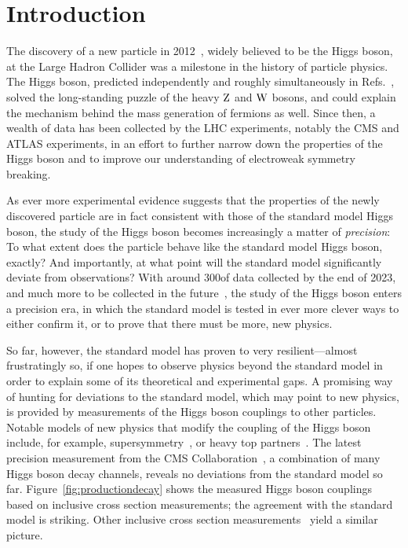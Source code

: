 \section{Introduction}
\label{sec:introduction}


The discovery of a new particle in 2012~\cite{Aad:2012tfa,Chatrchyan:2012xdj,Chatrchyan:2013lba}, widely believed to be the Higgs boson, at the Large Hadron Collider was a milestone in the history of particle physics.
% 
The Higgs boson, predicted independently and roughly simultaneously in Refs.~\cite{Higgs:1964pj,Englert:1964et,Guralnik:1964eu}, solved the long-standing puzzle of the heavy $\mathrm{Z}$ and $\mathrm{W}$ bosons, and could explain the mechanism behind the mass generation of fermions as well.
% 
Since then, a wealth of data has been collected by the LHC experiments, notably the CMS and ATLAS experiments, in an effort to further narrow down the properties of the Higgs boson and to improve our understanding of electroweak symmetry breaking.


As ever more experimental evidence suggests that the properties of the newly discovered particle are in fact consistent with those of the standard model Higgs boson,
% 
% 
the study of the Higgs boson becomes increasingly a matter of \textit{precision}: To what extent does the particle behave like the standard model Higgs boson, exactly?
% 
And importantly, at what point will the standard model significantly deviate from observations?
% 
With around 300\fbinv of data collected by the end of 2023, and much more to be collected in the future~\cite{hllhc}, the study of the Higgs boson enters a precision era, in which the standard model is tested in ever more clever ways to either confirm it, or to prove that there must be more, new physics.


So far, however, the standard model has proven to very resilient---almost frustratingly so, if one hopes to observe physics beyond the standard model in order to explain some of its theoretical and experimental gaps.
% 
A promising way of hunting for deviations to the standard model, which may point to new physics, is provided by measurements of the Higgs boson couplings to other particles.
% 
Notable models of new physics that modify the coupling of the Higgs boson include, for example, supersymmetry~\cite{Dimopoulos:1981zb,Witten:1981nf}, or heavy top partners~\cite{ArkaniHamed:2002qy,Banfi:2013yoa}.
% 
The latest precision measurement from the CMS Collaboration~\cite{Sirunyan:2018koj}, a combination of many Higgs boson decay channels, reveals no deviations from the standard model so far.
% 
Figure~\ref{fig:productiondecay} shows the measured Higgs boson couplings based on inclusive cross section measurements; the agreement with the standard model is striking.
% 
Other inclusive cross section measurements~\cite{Khachatryan:2016vau,Aad:2015zhl} yield a similar picture.



